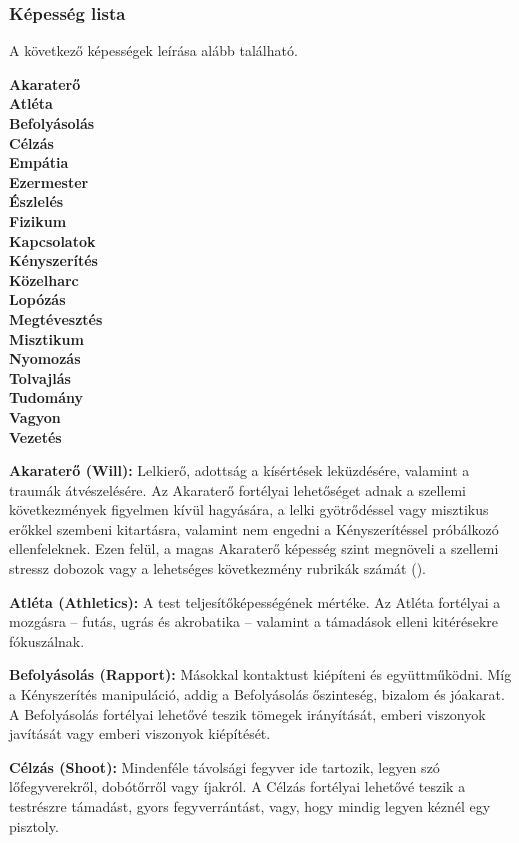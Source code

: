 \subsubsection{Képesség lista}

A következő képességek leírása alább található.

\begin{multicols}{5}
\setlength{\parindent}{0em}
\textbf{%
Akaraterő \\
Atléta \\
Befolyásolás \\
Célzás \\
Empátia \\
Ezermester \\
Észlelés \\
Fizikum \\
Kapcsolatok \\
Kényszerítés \\
Közelharc \\
Lopózás \\
Megtévesztés \\
Misztikum \\
Nyomozás \\
Tolvajlás \\
Tudomány \\
Vagyon \\
Vezetés
}
\end{multicols}

\textbf{Akaraterő (Will):} Lelkierő, adottság a kísértések leküzdésére, valamint a traumák átvészelésére. Az Akaraterő fortélyai lehetőséget adnak a szellemi következmények figyelmen kívül hagyására, a lelki gyötrődéssel vagy misztikus erőkkel szembeni kitartásra, valamint nem engedni a Kényszerítéssel próbálkozó ellenfeleknek. Ezen felül, a magas Akaraterő képesség szint megnöveli a szellemi stressz dobozok vagy a lehetséges következmény rubrikák számát ().

\textbf{Atléta (Athletics):} A test teljesítőképességének mértéke. Az Atléta fortélyai a mozgásra -- futás, ugrás és akrobatika -- valamint a támadások elleni kitérésekre fókuszálnak.

\textbf{Befolyásolás (Rapport):} Másokkal kontaktust kiépíteni és együttműködni. Míg a Kényszerítés manipuláció, addig a Befolyásolás őszinteség, bizalom és jóakarat. A Befolyásolás fortélyai lehetővé teszik tömegek irányítását, emberi viszonyok javítását vagy emberi viszonyok kiépítését.

\textbf{Célzás (Shoot):} Mindenféle távolsági fegyver ide tartozik, legyen szó lőfegyverekről, dobótőrről vagy íjakról. A Célzás fortélyai lehetővé teszik a testrészre támadást, gyors fegyverrántást, vagy, hogy mindig legyen kéznél egy pisztoly.

